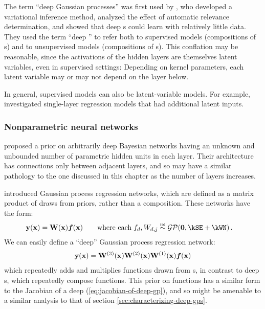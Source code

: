 The term ``deep Gaussian processes'' was first used by \citet{damianou2012deep}, who developed a variational inference method, analyzed the effect of automatic relevance determination, and showed that deep \gp{}s could learn with relatively little data.
%
They used the term ``deep \gp{}'' to refer both to supervised models (compositions of \gp{}s) and to unsupervised models (compositions of \gplvm{}s).
This conflation may be reasonable, since the activations of the hidden layers are themselves latent variables, even in supervised settings:
Depending on kernel parameters, each latent variable may or may not depend on the layer below.

In general, supervised models can also be latent-variable models.
For example, \citet{wang2012gaussian} investigated single-layer \gp{} regression models that had additional latent inputs.

\subsubsection{Nonparametric neural networks}
\citet{adams2010learning} proposed a prior on arbitrarily deep Bayesian networks having an unknown and unbounded number of parametric hidden units in each layer.
Their architecture has connections only between adjacent layers, and so may have a similar pathology to the one discussed in this chapter as the number of layers increases.

\citet{wilson2012gaussian} introduced Gaussian process regression networks, which are defined as a matrix product of draws from \gp{} priors, rather than a composition.
These networks have the form:
%
\begin{align}
\vy(\vx) & = \vW(\vx) \vf(\vx) \qquad \textnormal{where each} \; f_{d}, W_{d,j} \simiid \GPt{\vzero}{\kSE + \kWN} .
\end{align}
%
We can easily define a ``deep'' Gaussian process regression network:
%
\begin{align}
{\bf{y}}({\bf{x}}) = \mathbf{W}^{(3)}({\bf{x}}) \mathbf{W}^{(2)}({\bf{x}}) \mathbf{W}^{(1)}({\bf{x}}) \boldsymbol{f}({\bf{x}})
\end{align}
%
which repeatedly adds and multiplies functions drawn from \gp{}s, in contrast to deep \gp{}s, which repeatedly compose functions.
This prior on functions has a similar form to the Jacobian of a deep \gp{} (\cref{eq:jacobian-of-deep-gp}), and so might be amenable to a similar analysis to that of section \ref{sec:characterizing-deep-gps}.

